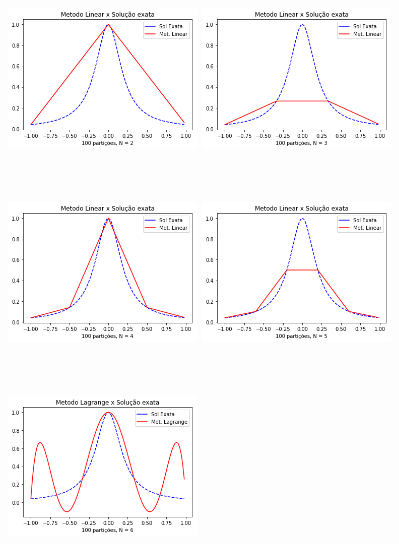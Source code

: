 \documentclass{article}
\begin{document}
\begin{figure}[!htb]
\centering
\includegraphics [width=5cm,height=5cm]{LSEa2.png}
\includegraphics [width=5cm,height=5cm]{LSEa3.png}
\includegraphics [width=5cm,height=5cm]{LSEa4.png}
\includegraphics [width=5cm,height=5cm]{LSEa5.png}
\includegraphics [width=5cm,height=5cm]{LSEa6.png}

\end{figure}
\end{document}
